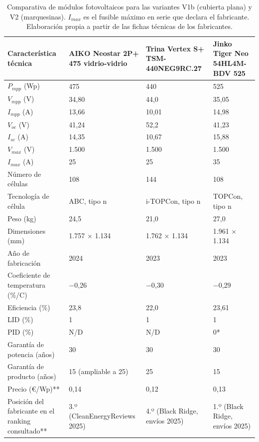 \begin{table}[htbp]
    \centering
    \caption{Comparativa de módulos fotovoltaicos para las variantes V1b (cubierta plana) y V2 (marquesinas). $I_{max}$ es el fusible máximo en serie que declara el fabricante. Elaboración propia a partir de las fichas técnicas de los fabricantes.}
    \label{tab:diseno-modulos-v1b-v2}
    \footnotesize
    \renewcommand{\arraystretch}{1.15}
    \begin{tabularx}{\textwidth}{|F{4.2cm}|Y|Y|Y|}
        \hline
        \textbf{Característica técnica} & \textbf{AIKO Neostar 2P+ 475 vidrio-vidrio} & \textbf{Trina Vertex S+ TSM-440NEG9RC.27} & \textbf{Jinko Tiger Neo 54HL4M-BDV 525} \\
        \hline
        $P_{mpp}$ (Wp) & 475 & 440 & 525 \\
        \hline
        $V_{mpp}$ (V) & 34,80 & 44,0 & 35,05 \\
        \hline
        $I_{mpp}$ (A) & 13,66 & 10,01 & 14,98 \\
        \hline
        $V_{oc}$ (V) & 41,24 & 52,2 & 41,23 \\
        \hline
        $I_{sc}$ (A) & 14,35 & 10,67 & 15,88 \\
        \hline
        $V_{max}$ (V) & 1.500 & 1.500 & 1.500 \\
        \hline
        $I_{max}$ (A) & 25 & 25 & 35 \\
        \hline
        Número de células & 108 & 144 & 108 \\
        \hline
        Tecnología de célula & ABC, tipo n & i-TOPCon, tipo n & TOPCon, tipo n \\
        \hline
        Peso (kg) & 24,5 & 21,0 & 27,0 \\
        \hline
        Dimensiones (mm) & 1.757 × 1.134 & 1.762 × 1.134 & 1.961 × 1.134 \\
        \hline
        Año de fabricación & 2024 & 2023 & 2023 \\
        \hline
        Coeficiente de temperatura (\%/\textdegree{}C) & $-$0,26 & $-$0,30 & $-$0,29 \\
        \hline
        Eficiencia (\%) & 23,8 & 22,0 & 23,61 \\
        \hline
        \acs{LID} (\%) & 1 & 1 & 1 \\
        \hline
        PID (\%) & N/D & N/D & 0* \\
        \hline
        Garantía de potencia (años) & 30 & 30 & 30 \\
        \hline
        Garantía de producto (años) & 15 (ampliable a 25) & 25 & 15 \\
        \hline
        Precio (€/Wp)** & 0,14 & 0,12 & 0,13 \\
        \hline
        Posición del fabricante en el ranking consultado** & 3.º (CleanEnergyReviews 2025) & 4.º (Black Ridge, envíos 2025) & 1.º (Black Ridge, envíos 2025) \\
        \hline
    \end{tabularx}


\end{table}
